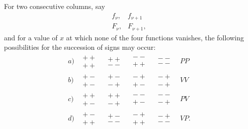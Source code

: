 \documentclass[11pt]{article}
\begin{document}
For two consecutive columns, say
\[
\begin{matrix}
f_\nu,&f_{\nu+1}\\
F_\nu,&F_{\nu+1},
\end{matrix}
\]
and for a value of $x$ at which none of the four functions vanishes, the following possibilities for the succession of signs may occur:
\[
\begin{array}{c|cccc|c}
a)&\begin{matrix}++\\++\end{matrix}&
  \begin{matrix}++\\--\end{matrix}&
  \begin{matrix}--\\++\end{matrix}&
  \begin{matrix}--\\--\end{matrix}&PP\\[0.7em]
b)&\begin{matrix}+-\\+-\end{matrix}&
  \begin{matrix}+-\\-+\end{matrix}&
  \begin{matrix}-+\\+-\end{matrix}&
  \begin{matrix}-+\\-+\end{matrix}&VV\\[0.7em]
c)&\begin{matrix}++\\+-\end{matrix}&
  \begin{matrix}++\\-+\end{matrix}&
  \begin{matrix}--\\+-\end{matrix}&
  \begin{matrix}--\\-+\end{matrix}&PV\\[0.7em]
d)&\begin{matrix}+-\\++\end{matrix}&
  \begin{matrix}+-\\--\end{matrix}&
  \begin{matrix}-+\\++\end{matrix}&
  \begin{matrix}-+\\--\end{matrix}&VP.
\end{array}
\]
\end{document}
